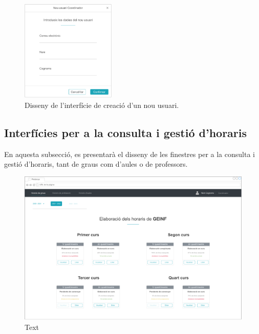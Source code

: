 \documentclass[a4paper,12pt]{ThesisStyle}
\begin{document}
\begin{figure}[H]
	\centering
	\includegraphics[width=0.4\textwidth]{assets/interfaces/administradors/gestCoords/nouUsuariDialog.pdf}
	\caption{\label{img:gestCoords_nouUsuariDialog}Disseny de l'interfície de creació d'un nou usuari.}
\end{figure}

\subsection{Interfícies per a la consulta i gestió d'horaris}
\label{subsec:interficies_consulta_gestio_horaris}

En aquesta subsecció, es presentarà el disseny de les finestres per a la consulta i gestió d'horaris, tant de graus com d'aules o de professors.

\begin{figure}[H]
	\centering
	\includegraphics[width=\textwidth]{assets/interfaces/coordinadors/horarisGraus/selHorari.pdf}
	\caption{\label{img:horarisGraus_selHorari}Text}
\end{figure}
\end{document}
